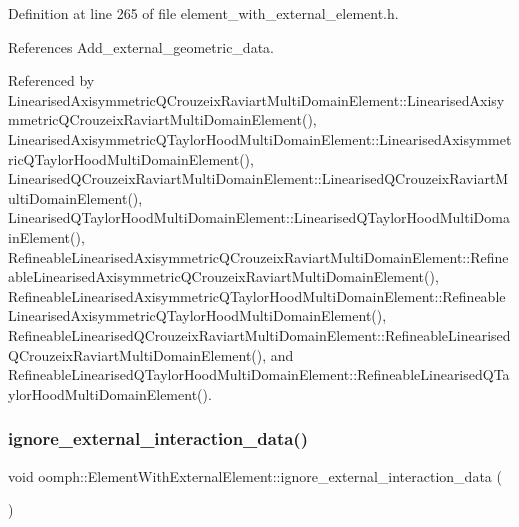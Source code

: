 Definition at line 265 of file element\+\_\+with\+\_\+external\+\_\+element.\+h.



References Add\+\_\+external\+\_\+geometric\+\_\+data.



Referenced by Linearised\+Axisymmetric\+Q\+Crouzeix\+Raviart\+Multi\+Domain\+Element\+::\+Linearised\+Axisymmetric\+Q\+Crouzeix\+Raviart\+Multi\+Domain\+Element(), Linearised\+Axisymmetric\+Q\+Taylor\+Hood\+Multi\+Domain\+Element\+::\+Linearised\+Axisymmetric\+Q\+Taylor\+Hood\+Multi\+Domain\+Element(), Linearised\+Q\+Crouzeix\+Raviart\+Multi\+Domain\+Element\+::\+Linearised\+Q\+Crouzeix\+Raviart\+Multi\+Domain\+Element(), Linearised\+Q\+Taylor\+Hood\+Multi\+Domain\+Element\+::\+Linearised\+Q\+Taylor\+Hood\+Multi\+Domain\+Element(), Refineable\+Linearised\+Axisymmetric\+Q\+Crouzeix\+Raviart\+Multi\+Domain\+Element\+::\+Refineable\+Linearised\+Axisymmetric\+Q\+Crouzeix\+Raviart\+Multi\+Domain\+Element(), Refineable\+Linearised\+Axisymmetric\+Q\+Taylor\+Hood\+Multi\+Domain\+Element\+::\+Refineable\+Linearised\+Axisymmetric\+Q\+Taylor\+Hood\+Multi\+Domain\+Element(), Refineable\+Linearised\+Q\+Crouzeix\+Raviart\+Multi\+Domain\+Element\+::\+Refineable\+Linearised\+Q\+Crouzeix\+Raviart\+Multi\+Domain\+Element(), and Refineable\+Linearised\+Q\+Taylor\+Hood\+Multi\+Domain\+Element\+::\+Refineable\+Linearised\+Q\+Taylor\+Hood\+Multi\+Domain\+Element().

\mbox{\label{classoomph_1_1ElementWithExternalElement_a59bfba4d5a3c0f1cc8d35f144bba6df1}} 
\subsubsection{\texorpdfstring{ignore\+\_\+external\+\_\+interaction\+\_\+data()}{ignore\_external\_interaction\_data()}}
{\footnotesize\ttfamily void oomph\+::\+Element\+With\+External\+Element\+::ignore\+\_\+external\+\_\+interaction\+\_\+data (\begin{DoxyParamCaption}{ }\end{DoxyParamCaption})\hspace{0.3cm}{\ttfamily [inline]}}



